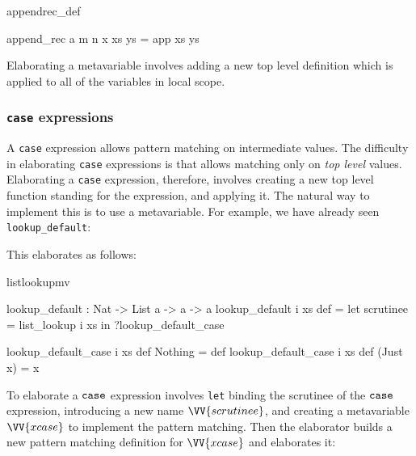 \begin{SaveVerbatim}{appendrec_def}

append_rec a m n x xs ys = app xs ys

\end{SaveVerbatim}

Elaborating a metavariable involves adding a new top level definition which is applied
to all of the variables in local scope.


\subsubsection{\texttt{case} expressions}

A \texttt{case} expression allows pattern matching on intermediate values. The difficulty
in elaborating \texttt{case} expressions is that \TT{} allows matching only on
\emph{top level} values. Elaborating a \texttt{case} expression, therefore,
involves creating a new top level function standing for the expression, and applying it. 
The natural
way to implement this is to use a metavariable. For example, we have already seen
\texttt{lookup\_default}:


\noindent
This elaborates as follows:

\begin{SaveVerbatim}{listlookupmv}

lookup_default : Nat -> List a -> a -> a
lookup_default i xs def = 
   let scrutinee = list_lookup i xs in ?lookup_default_case

lookup_default_case i xs def Nothing  = def
lookup_default_case i xs def (Just x) = x

\end{SaveVerbatim}

To elaborate a $\mathtt{case}$ expression involves \texttt{let} binding the scrutinee
of the $\mathtt{case}$ expression, introducing a new name $\VV{scrutinee}$, and
creating a metavariable $\VV{xcase}$ to implement the pattern matching. Then
the elaborator builds a new pattern matching definition for $\VV{xcase}$ and
elaborates it:


